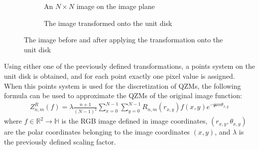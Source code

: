 \begin{figure}[tb]
  \begin{subfigure}{.43\textwidth}
  \centering
  \caption{An $N \times N$ image on the image plane}
  \end{subfigure}
  \begin{subfigure}{.05\textwidth}
    \centering
  \end{subfigure}
  \begin{subfigure}{.50\textwidth}
    \centering
    \caption{The image transformed onto the unit disk}
    \end{subfigure}
  \caption{The image before and after applying the transformation onto the unit disk}
  \label{fig:transform2}
\end{figure}

Using either one of the previously defined transformations, a points system on the unit disk is obtained, and for each point exactly one pixel value is assigned. When this points system is used for the discretization of QZMs, the following formula can be used to approximate the QZMs of the original image function:
\begin{gather*}
  Z_{n,m}^R(f) = \lambda\frac{n + 1}{(N - 1)^2}\sum_{x = 0}^{N-1}\sum_{y = 0}^{N-1}R_{n,m}(r_{x,y})f(x,y)e^{-\bm{\mu}m\theta_{x,y}}
\end{gather*}
where $f \in \mathds{R}^2 \rightarrow \mathds{H}$ is the RGB image defined in image coordinates, $(r_{x,y},\theta_{x,y})$ are the polar coordinates belonging to the image coordinates $(x,y)$, and $\lambda$ is the previously defined scaling factor.

